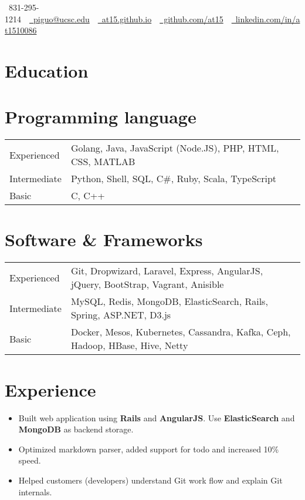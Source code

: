 \documentclass[10pt, letterpaper]{simple-cv}
\begin{document}
\centerline{\faMobile\ 831-295-1214\ \
\href{mailto:piguo@ucsc.edu}{\faEnvelope\ piguo@ucsc.edu}\ \
\href{https://at15.github.io}{\faHome\ at15.github.io}\ \
\href{https://github.com/at15}{\faGithubSquare\ github.com/at15}\ \
\href{https://www.linkedin.com/in/at1510086}{\faLinkedinSquare\ linkedin.com/in/at1510086}}

\section{Education}

\section{Programming language}
\begin{tabular}{ l l }
 Experienced & Golang, Java, JavaScript (Node.JS), PHP, HTML, CSS, MATLAB \\
 Intermediate & Python, Shell, SQL, C\#, Ruby,  Scala, TypeScript \\
 Basic & C, C++
\end{tabular}

\section{Software \& Frameworks}
\begin{tabular}{ l l }
 Experienced & Git, Dropwizard, Laravel, Express, AngularJS, jQuery, BootStrap, Vagrant, Anisible\\
 Intermediate & MySQL, Redis, MongoDB, ElasticSearch, Rails, Spring, ASP.NET, D3.js \\
 Basic & Docker, Mesos, Kubernetes, Cassandra, Kafka, Ceph, Hadoop, HBase, Hive, Netty
\end{tabular}

\section{Experience}

\begin{itemize}
\item Built web application using \textbf{Rails} and \textbf{AngularJS}. Use \textbf{ElasticSearch} and \textbf{MongoDB} as backend storage.
\item Optimized markdown parser, added support for todo and increased 10\% speed.
\item Helped customers (developers) understand Git work flow and explain Git internals.
\end{itemize}
\end{document}
